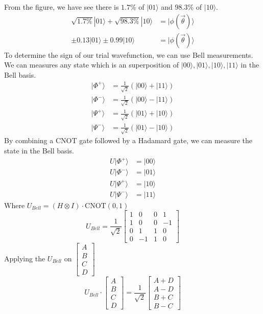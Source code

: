 \documentclass{article}
\begin{document}
From the figure, we have see there is \(1.7 \% \) of \(|01\rangle\) and \(98.3 \%\) of \(|10\rangle\).
\begin{align*}
	\sqrt{1.7 \% }|01\rangle + \sqrt{98.3 \%}|10\rangle & = |\phi(\vec{\theta}) \rangle \\
	\pm 0.13|01\rangle \pm 0.99  |10\rangle             & = |\phi(\vec{\theta}) \rangle
\end{align*}
To determine the sign of our trial wavefunction, we can use Bell measurements. We can measures any state which is an superposition of \(|00\rangle, |01\rangle, |10\rangle , |11\rangle\) in the Bell basis.
\begin{align*}
	|\Phi^+\rangle & = \frac{1}{\sqrt{2}}(|00\rangle + |11\rangle) \\
	|\Phi^-\rangle & = \frac{1}{\sqrt{2}}(|00\rangle - |11\rangle) \\
	|\Psi^+\rangle & = \frac{1}{\sqrt{2}}(|01\rangle + |10\rangle) \\
	|\Psi^-\rangle & = \frac{1}{\sqrt{2}}(|01\rangle - |10\rangle)
\end{align*}
By combining a CNOT gate followed by a Hadamard gate, we can measure the state in the Bell basis.
\begin{align*}
	U |\Phi^+\rangle & = |00\rangle \\
	U |\Phi^-\rangle & = |01\rangle \\
	U |\Psi^+\rangle & = |10\rangle \\
	U |\Psi^-\rangle & = |11\rangle
\end{align*}
Where \(U_{Bell} = \left( H \otimes I \right) \cdot \text{CNOT}(0,1)\)
\begin{equation*}
	U_{Bell} = \frac{1}{\sqrt{2}}\begin{bmatrix}
		1 & 0  & 0 & 1  \\
		1 & 0  & 0 & -1 \\
		0 & 1  & 1 & 0  \\
		0 & -1 & 1 & 0
	\end{bmatrix}
\end{equation*}
Applying the \(U_{Bell}\) on \(\begin{bmatrix}
	A \\
	B \\
	C \\
	D
\end{bmatrix}\)
\begin{equation*}
	U_{Bell} \cdot \begin{bmatrix}
		A \\
		B \\
		C \\
		D
	\end{bmatrix}
	=
	\frac{1}{\sqrt{2}}\begin{bmatrix}
		A + D \\
		A-D   \\
		B+C   \\
		B - C
	\end{bmatrix}
\end{equation*}
\end{document}
